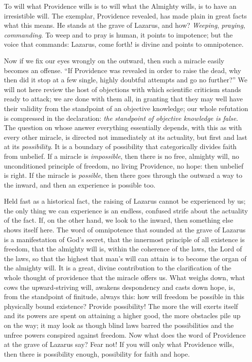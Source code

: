 \documentclass[12pt,a4paper,openany]{book}
\newcommand{\opage}[1]{\marginnote{\footnotesize\textit{[#1]}}}
\begin{document}
To will what Providence wills is to will what the Almighty wills, is to have an irresistible will. The exemplar,
Providence revealed, has made plain in great facts what this means. He stands at the grave of Lazarus, and how?
\emph{Weeping}, \emph{praying}, \emph{commanding}. To weep and to pray is human,
\setcounter{footnote}{0}%
\opage{65}it points to impotence; but the voice that commands: Lazarus, come forth! is divine and points to
omnipotence.

Now if we fix our eyes wrongly on the outward, then such a miracle easily becomes an offense. ``If Providence was
revealed in order to raise the dead, why then did it stop at a few single, highly doubtful attempts and go no
further?'' We will not here review the host of objections with which scientific criticism stands ready to attack; we
are done with them all, in granting that they may well have their validity from the standpoint of an objective
knowledge; our whole refutation is compressed in the declaration: \emph{the standpoint of objective knowledge is
false}. The question on whose answer everything essentially depends, with this as with every other miracle, is
directed not immediately at its actuality, but first and last at its \emph{possibility}. It is a boundary of
possibility that categorically divides faith from unbelief. If a miracle is \emph{impossible}, then there is no free,
almighty will, no unconditioned principle of freedom, no living Providence, no hope: then unbelief is right. If the
miracle is \emph{possible}, then there goes through the outward a way to the inward, and then an experience is
possible too.

Held fast as a historical fact, the raising of Lazarus cannot be experienced by us; the only thing we can experience is
an endless, confused strife about the actuality of the fact. If, on the other hand, we look to the inward, then
something else shows itself here. The word of omnipotence that sounded at the grave of Lazarus is a manifestation of
God's secret, that the innermost principle of all existence
\setcounter{footnote}{0}%
\opage{66}is freedom, that the almighty will is, within the coherence of the laws, the Lord of the laws, so that the
highest that man's will can attain is to become the organ of the almighty will. It is a great, divine contribution to
the clarification of the whole thought of providence that the miracle offers us. What weighs down, what cows the
upward-striving will, awakens despondency and casts down hope, is, from the standpoint of finitude, always this: how
will freedom be possible in this physically bound existence? Provide possibility! The more the will exerts itself and
its powers are spent on attaining a higher good, the more obstacles pile up on the way; it may look as though blind
laws barred the possibilities and the unfree powers conspired against freedom. Now what does the word of Providence at
the grave of Lazarus say? Fear not! If you will only what Providence wills, then there is possibility enough,
possibility for faith and hope.
\end{document}
